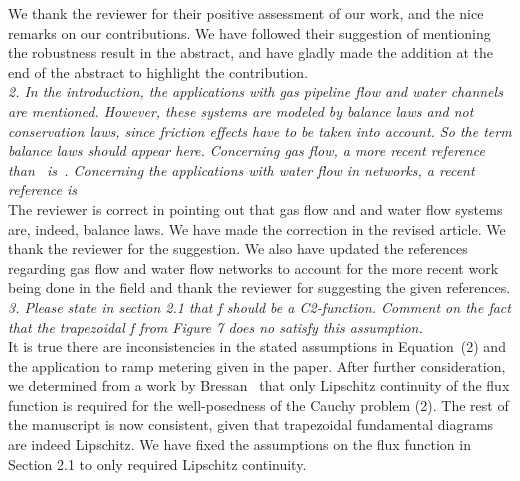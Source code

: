\documentclass[10pt]{article}
\begin{document}
We thank the reviewer for their positive assessment of our work, and the nice remarks on our contributions. We have followed their suggestion of mentioning the robustness result in the abstract, and have gladly made the addition at the end of the abstract to highlight the contribution.\\


\emph{2. In the introduction, the applications with gas pipeline flow and water channels are mentioned. However, these systems are modeled by balance laws and not conservation laws, since friction effects have to be taken into account. So the term balance laws should appear here.
Concerning gas flow, a more recent reference than~\cite{Rothfarb1970} is~\cite{Gugat2011Gas}.
Concerning the applications with water flow in networks, a recent reference is~\cite{Gugat2012Contamination}}\\

The reviewer is correct in pointing out that gas flow and and water flow systems are, indeed, balance laws. We have made the correction in the revised article. We thank the reviewer for the suggestion.
We also have updated the references regarding gas flow and water flow networks to account for the more recent work being done in the field and thank the reviewer for suggesting the given references.\\

\emph{3. Please state in section 2.1 that f should be a C2-function. Comment on the fact that the trapezoidal f from Figure 7 does no satisfy this assumption.}\\

It is true there are inconsistencies in the stated assumptions in Equation~(2) and the application to ramp metering given in the paper. After further consideration, we determined from a work by Bressan~\cite{Bressan2006Hyperbolic} that only Lipschitz continuity of the flux function is required for the well-posedness of the Cauchy problem (2). The rest of the manuscript is now consistent, given that trapezoidal fundamental diagrams are indeed Lipschitz. We have fixed the assumptions on the flux function in Section 2.1 to only required Lipschitz continuity.\\

\end{document}
